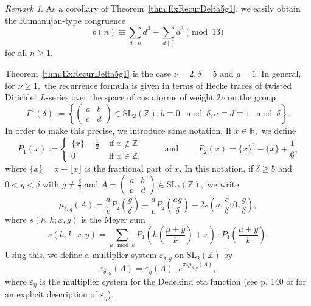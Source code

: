 \documentclass[10pt]{amsart}
\theoremstyle{definition}
\theoremstyle{remark}
\newtheorem*{remark}{Remark}
\numberwithin{equation}{section}
\newcommand{\R}{\mathbb R}
\newcommand{\SL}{\mathrm{SL}}
\newcommand{\Z}{\mathbb Z}
\begin{document}
	\begin{remark}
		As a corollary of Theorem~\ref{thm:ExRecurDelta5g1}, we easily obtain the Ramanujan-type congruence
		$$
		b(n) \equiv \sum\limits_{d\mid n}d^3-\sum\limits_{d\mid\frac{n}{5}}d^3\pmod{13}
		$$
		for all $n\geq 1.$
	\end{remark}
	
	Theorem~\ref{thm:ExRecurDelta5g1} is the case $\nu=2, \delta=5$ and $g=1.$ In general, for $\nu\geq 1,$ the recurrence formula is given in terms of Hecke traces
	of twisted Dirichlet $L$-series over the space of cusp forms of weight $2\nu$ on the group
	$$
	\Gamma^1(\delta):=\left\{\begin{pmatrix}
		a & b \\
		c & d
	\end{pmatrix}\in\SL_2(\Z) : b\equiv 0\mod\delta, a\equiv d\equiv 1\mod\delta\right\}.
	$$ In order to make this precise, we introduce some notation. If $x\in\R,$ we define
	$$
	P_1(x):=\begin{cases}
		\{x\}-\frac{1}{2} & \text{ if }x\not\in\Z \\
		0 & \text{ if }x\in\Z,
	\end{cases}\qquad\text{ and }\qquad P_2(x)=\{x\}^2-\{x\}+\frac{1}{6},
	$$
	where $\{x\}=x-\lfloor x\rfloor$ is the fractional part of $x.$ 
	In this notation, if $\delta\geq 5$ and $0<g<\delta$ with $g\neq\frac{\delta}{2}$ and $A=\begin{pmatrix}
		a & b \\
		c & d
	\end{pmatrix}\in\SL_2(\Z),$ we write
	$$
	\mu_{\delta,g}(A)=\frac{a}{c}P_2\left(\frac{g}{\delta}\right)+\frac{d}{c}P_2\left(\frac{ag}{\delta}\right)-2s\left(a,\frac{c}{\delta};0,\frac{g}{\delta}\right),
	$$
	where $s(h,k;x,y)$ is the Meyer sum
	$$
	s(h,k;x,y)=\sum\limits_{\mu\mod k}P_1\left(h\left(\frac{\mu + y}{k}\right)+x\right)\cdot P_1\left(\frac{\mu + y}{k}\right).
	$$
	Using this, we define a multiplier system $\varepsilon_{\delta,g}$ on $\SL_2(\Z)$ by
	$$
	\varepsilon_{\delta,g}(A)=\varepsilon_\eta(A)\cdot e^{\pi i\mu_{\delta,g}(A)},
	$$
	where $\varepsilon_\eta$ is the multiplier system for the Dedekind eta function (see p. 140 of \cite{HMFBook} for an explicit description of $\varepsilon_\eta$). 
	
\end{document}
